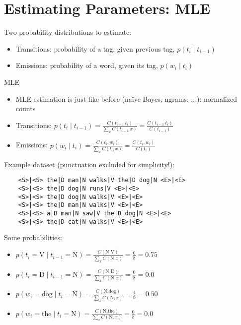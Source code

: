 \documentclass[11pt,letterpaper]{article}
\begin{document}
\section{Estimating Parameters: MLE}

Two probability distributions to estimate:

\begin{itemize}
  \item Transitions: probability of a tag, given previous tag, $p(t_i \mid t_{i-1})$
  \item Emissions: probability of a word, given its tag, $p(w_i \mid t_i)$
\end{itemize}

MLE

\begin{itemize}
  \item MLE estimation is just like before (na\"{i}ve Bayes, ngrams, ...): normalized counts
  \item Transitions: $p(t_i \mid t_{i-1}) = \frac{C(t_{i-1}~t_i)}{\sum_x C(t_{i-1}~x)} = \frac{C(t_{i-1}~t_i)}{C(t_{i-1})}$
  \item Emissions: $p(w_i \mid t_i) = \frac{C(t_i,w_i)}{\sum_x C(t_i,x)} = \frac{C(t_i,w_i)}{C(t_i)}$
\end{itemize}

Example dataset (punctuation excluded for simplicity!):
\vspace{-2mm}
\begin{verbatim}
    <S>|<S> the|D man|N walks|V the|D dog|N <E>|<E> 
    <S>|<S> the|D dog|N runs|V <E>|<E> 
    <S>|<S> the|D dog|N walks|V <E>|<E> 
    <S>|<S> the|D man|N walks|V <E>|<E> 
    <S>|<S> a|D man|N saw|V the|D dog|N <E>|<E> 
    <S>|<S> the|D cat|N walks|V <E>|<E> 
\end{verbatim}

Some probabilities:

\begin{itemize}
  \item $p(t_i=\text{V} \mid t_{i-1}=\text{N}) = \frac{C(\text{N V})}{\sum_x C(\text{N } x)} = \frac{6}{8} = 0.75$
  \item $p(t_i=\text{D} \mid t_{i-1}=\text{N}) = \frac{C(\text{N D})}{\sum_x C(\text{N } x)} = \frac{0}{8} = 0.0$
  \\
  \item $p(w_i=\text{dog} \mid t_i=\text{N}) = \frac{C(\text{N,dog})}{\sum_x C(\text{N},x)} = \frac{4}{8} = 0.50$
  \item $p(w_i=\text{the} \mid t_i=\text{N}) = \frac{C(\text{N,the})}{\sum_x C(\text{N},x)} = \frac{0}{8} = 0.0$
\end{itemize}
\end{document}
